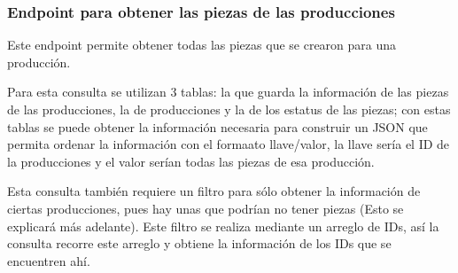 \subsubsection{Endpoint para obtener las piezas de las producciones}
Este endpoint permite obtener todas las piezas que se crearon para una producción.

Para esta consulta se utilizan 3 tablas: la que guarda la información de las piezas de las producciones, la de producciones y la de los estatus de las piezas; con estas tablas se puede obtener la información necesaria para construir un JSON que permita ordenar la información con el formaato llave/valor, la llave sería el ID de la producciones y el valor serían todas las piezas de esa producción.

Esta consulta también requiere un filtro para sólo obtener la información de ciertas producciones, pues hay unas que podrían no tener piezas (Esto se explicará más adelante). Este filtro se realiza mediante un arreglo de IDs, así la consulta recorre este arreglo y obtiene la información de los IDs que se encuentren ahí.
